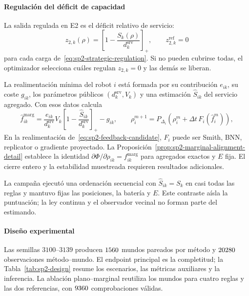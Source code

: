 \paragraph{Regulación del déficit de capacidad}

La salida regulada en E2 es el déficit relativo de servicio:
\begin{equation}
 z_{2,k}(\rho)=
 \left[1-\frac{S_k(\rho)}{d_k^{\mathrm{srv}}}\right]_+,
 \qquad z_{2,k}^{\mathrm{ref}}=0
 \label{eq:sp2-strategic-regulation}
\end{equation}
para cada carga de~\eqref{eq:sp2-strategic-regulation}. Si no pueden cubrirse todas, el optimizador selecciona cuáles regulan $z_{2,k}=0$ y las demás se liberan.

La realimentación mínima del robot $i$ está formada por su contribución $e_{ik}$, su coste $g_{ik}$, los parámetros públicos $(d_k^{\mathrm{srv}},V_k)$ y una estimación $\widehat S_{ik}$ del servicio agregado. Con esos datos calcula
\begin{equation}
 \widehat f_{ik}^{\mathrm{marg}}
 =\frac{e_{ik}}{d_k^{\mathrm{srv}}}V_k
  \left[1-\frac{\widehat S_{ik}}{d_k^{\mathrm{srv}}}\right]_+-g_{ik},
 \qquad
 \rho_i^{m+1}=P_{\Delta_i}\!\left(
 \rho_i^m+\Delta t\,F_i(\widehat f_i^m)\right),
 \label{eq:sp2-feedback-candidate}
\end{equation}
En la realimentación de~\eqref{eq:sp2-feedback-candidate}, $F_i$ puede ser Smith, BNN, replicator o gradiente proyectado. La Proposición~\ref{prop:sp2-marginal-alignment-detail} establece la identidad $\partial\Phi/\partial\rho_{ik}=f_{ik}^{\mathrm{marg}}$ para agregados exactos y $E$ fija. El cierre entero y la estabilidad muestreada requieren resultados adicionales.

La campaña ejecutó una ordenación secuencial con $\widehat S_{ik}=S_k$ en casi todas las reglas y mantuvo fijas las posiciones, la batería y $E$. Este contraste aísla la puntuación; la ley continua y el observador vecinal no forman parte del estimando.
\paragraph{Diseño experimental}

Las semillas $3100$--$3139$ producen $1560$ mundos pareados por método y $20280$ observaciones método--mundo. El endpoint principal es la completitud; la Tabla~\ref{tab:sp2-design} resume los escenarios, las métricas auxiliares y la inferencia. La ablación plano--marginal reutiliza los mundos para cuatro reglas y las dos referencias, con $9360$ comprobaciones válidas.

